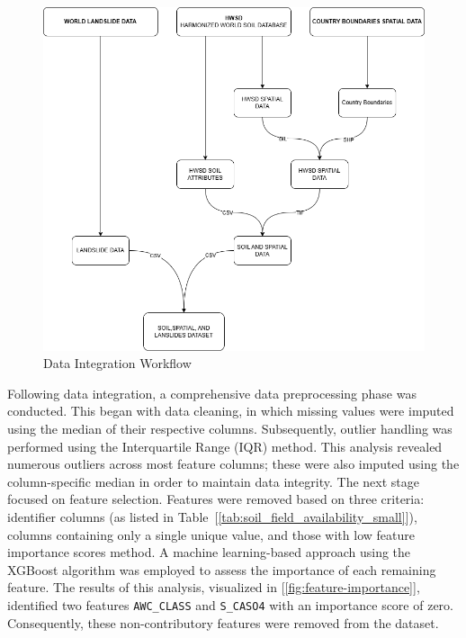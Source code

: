 \begin{figure}[htbp]
    \centerline{\includegraphics[width=\linewidth]{fig3.png}}
    \caption{Data Integration Workflow}
    \label{fig:data-integration-workflow}
\end{figure}

Following data integration, a comprehensive data preprocessing phase was conducted. This began with data cleaning, in which missing values were imputed using the median of their respective columns. Subsequently, outlier handling was performed using the Interquartile Range (IQR) method\cite{mthd01}. This analysis revealed numerous outliers across most feature columns; these were also imputed using the column-specific median in order to maintain data integrity.
The next stage focused on feature selection. Features were removed based on three criteria: identifier columns (as listed in Table~[\ref{tab:soil_field_availability_small}]), columns containing only a single unique value, and those with low feature importance scores method. A machine learning-based approach using the XGBoost algorithm was employed to assess the importance of each remaining feature\cite{mthd02}. The results of this analysis, visualized in [\ref{fig:feature-importance}], identified two features \texttt{AWC\_CLASS} and \texttt{S\_CASO4} with an importance score of zero. Consequently, these non-contributory features were removed from the dataset.

